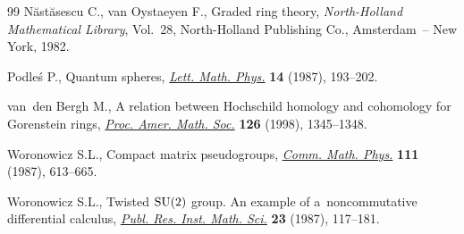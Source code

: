 \begin{thebibliography}{99}
N{\u{a}}st{\u{a}}sescu C., van Oystaeyen F., Graded ring theory,
 \textit{North-Holland Mathematical Library}, Vol.~28, North-Holland
 Publishing Co., Amsterdam~-- New York, 1982.

Podle{\'s} P., Quantum spheres, \href{http://dx.doi.org/10.1007/BF00416848}{\textit{Lett. Math. Phys.}} \textbf{14} (1987),
 193--202.

van~den Bergh M., A relation between {H}ochschild homology and cohomology for
 {G}orenstein rings, \href{http://dx.doi.org/10.1090/S0002-9939-98-04210-5}{\textit{Proc. Amer. Math. Soc.}} \textbf{126} (1998),
 1345--1348.

Woronowicz S.L., Compact matrix pseudogroups, \href{http://dx.doi.org/10.1007/BF01219077}{\textit{Comm. Math. Phys.}}
 \textbf{111} (1987), 613--665.

Woronowicz S.L., Twisted {${\rm SU}(2)$} group. {A}n example of
 a~noncommutative dif\/ferential calculus, \href{http://dx.doi.org/10.2977/prims/1195176848}{\textit{Publ. Res. Inst. Math. Sci.}}
 \textbf{23} (1987), 117--181.

\end{thebibliography}
